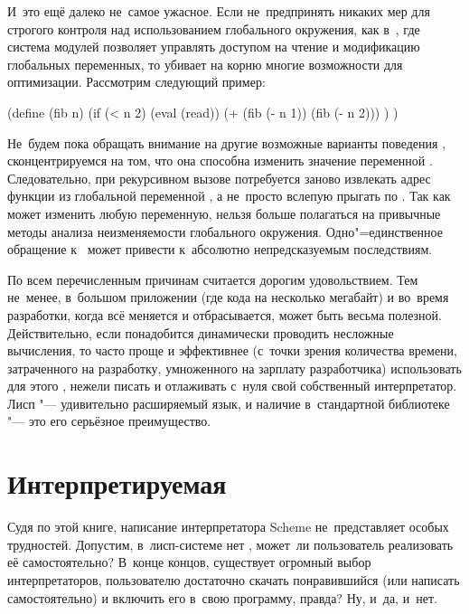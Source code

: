 И~это ещё далеко не~самое ужасное. Если не~предпринять никаких мер для строгого
контроля над использованием глобального окружения, как в~\cite{qp91b}, где
система модулей позволяет управлять доступом на чтение и модификацию глобальных
переменных, то  убивает на корню многие возможности для оптимизации.
Рассмотрим следующий пример:


\begin{code:lisp}
(define (fib n)
  (if (< n 2) (eval (read))
      (+ (fib (- n 1)) (fib (- n 2))) ) )
\end{code:lisp}

Не~будем пока обращать внимание на другие возможные варианты поведения
, сконцентрируемся на том, что она способна изменить значение
переменной . Следовательно, при рекурсивном вызове потребуется заново
извлекать адрес функции из глобальной переменной , а не~просто вслепую
прыгать по . Так как  может изменить любую переменную, нельзя
больше полагаться на привычные методы анализа неизменяемости глобального
окружения. Одно"=единственное обращение к~ может привести к~абсолютно
непредсказуемым последствиям.

По всем перечисленным причинам  считается дорогим удовольствием. Тем
не~менее, в~большом приложении (где кода на несколько мегабайт) и во~время
разработки, когда всё меняется и отбрасывается,  может быть весьма
полезной. Действительно, если понадобится динамически проводить несложные
вычисления, то часто проще и эффективнее (с~точки зрения количества времени,
затраченного на разработку, умноженного на зарплату разработчика) использовать
для этого , нежели писать и отлаживать с~нуля свой собственный
интерпретатор. Лисп "--- удивительно расширяемый язык, и наличие 
в~стандартной библиотеке "--- это его серьёзное преимущество.


\section{\texorpdfstring{Интерпретируемая \protect{}}%
{Интерпретируемая eval}}%
\label{reflection/sect:interpreted-eval}

Судя по этой книге, написание интерпретатора Scheme не~представляет особых
трудностей. Допустим, в~лисп-системе нет , может~ли пользователь
реализовать её самостоятельно? В~конце концов, существует огромный выбор
интерпретаторов, пользователю достаточно скачать понравившийся (или написать
самостоятельно) и включить его в~свою программу, правда? Ну, и~да, и~нет.

